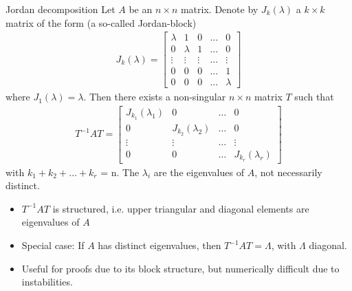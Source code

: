 \documentclass[handout]{beamer}  %
\begin{document}
\begin{frame}[shrink]
\frametitle{\secname}\framesubtitle{}\scriptsize
\begin{block}{Jordan decomposition}
  Let $A$ be an $n \times n$ matrix. Denote by $J_k(\lambda)$ a $k\times k$ matrix of the form (a so-called Jordan-block)
  \begin{align*}
    J_k(\lambda) = \begin{bmatrix}
      \lambda & 1 & 0 & \dots & 0\\
      0 & \lambda & 1 & \dots & 0\\
      \vdots & \vdots & \vdots & \dots & \vdots\\
      0 & 0& 0 & \dots & 1\\
      0 & 0 &0 & \dots & \lambda
    \end{bmatrix}
  \end{align*}
  where $J_1(\lambda)=\lambda$. Then there exists a non-singular $n\times n$ matrix $T$ such that
  \begin{align*}
    T^{-1} A T = \begin{bmatrix}
      J_{k_1}(\lambda_1) & 0 & \dots & 0 \\
      0 & J_{k_2}(\lambda_2) & \dots & 0 \\
      \vdots & \vdots & \dots & \vdots\\
      0 & 0 & \dots & J_{k_r}(\lambda_r)
    \end{bmatrix}
  \end{align*}
  with $k_1+k_2+\dots+k_r$ = n. The $\lambda_i$ are the eigenvalues of $A$, not necessarily distinct.
\end{block}
\begin{itemize}
  \item $T^{-1} A T$ is structured, i.e. upper triangular and diagonal elements are eigenvalues of $A$
  \item Special case: If $A$ has distinct eigenvalues, then $T^{-1}AT = \Lambda$, with $\Lambda$ diagonal.
  \item Useful for proofs due to its block structure, but numerically difficult due to instabilities.
\end{itemize}
\end{frame}
\end{document}
